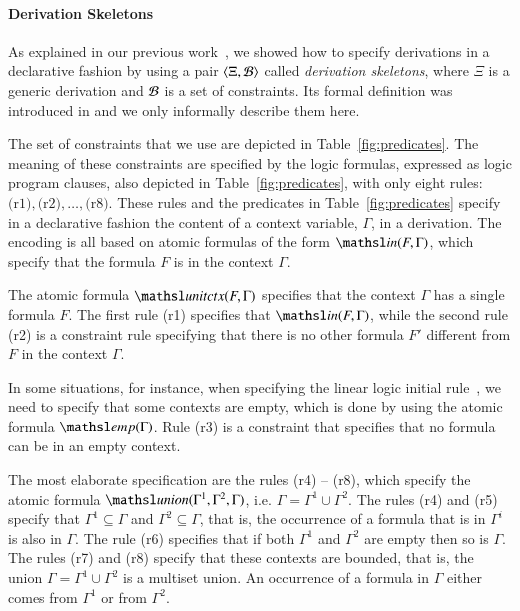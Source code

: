 \documentclass[a4paper,10pt]{article}
\newcommand{\elin}[2]{\ensuremath{{\tsl{unitctx}(\ensuremath{#1}, \ensuremath{#2})}}}
\newcommand{\emp}[1]{\ensuremath{{\tsl{emp}(\ensuremath{#1})}}}
\newcommand{\union}[3]{\ensuremath{{\tsl{union}(\ensuremath{#1},\ensuremath{#2},\ensuremath{ #3})}}}
\newcommand{\In}[2]{\ensuremath{\tsl{in}(\ensuremath{#1},\ensuremath{#2})}}
\begin{document}
\paragraph{Derivation Skeletons}
As explained in our previous work~\cite{nigam13iclp}, we showed how to specify derivations in a declarative fashion 
by using a pair $\langle\Xi, {\cal B}\rangle$ called \emph{derivation skeletons}, where $\Xi$ is a generic derivation and 
${\cal B}$ is a set of constraints.
Its formal definition was introduced in \cite{nigam13iclp} and we only informally describe them here.   

The set of constraints that we use are depicted in Table~\ref{fig:predicates}.
The meaning of these constraints are specified by the logic formulas, expressed as logic program clauses, 
also depicted in Table~\ref{fig:predicates}, with 
only eight rules: $\textrm{(r1)}, \textrm{(r2)},\ldots, \textrm{(r8)}$. These
rules and the predicates in Table~\ref{fig:predicates} specify in a declarative 
fashion the content of a context variable, $\Gamma$, in a derivation.
The encoding is all based on atomic formulas of the form $\In{F}{\Gamma}$, which 
specify that the formula $F$ is in the context $\Gamma$. 

The atomic formula $\elin{F}{\Gamma}$ specifies that the context $\Gamma$ has a
single formula $F$. 
The first rule (r1) specifies that $\In{F}{\Gamma}$, while the second rule (r2) is a constraint
rule specifying that there is no other formula $F'$ different from $F$ in the context $\Gamma$.

In some situations, for instance, when specifying the linear logic initial rule~\cite{girard87tcs}, 
we need to specify that some contexts are empty, which is done by using the atomic formula $\emp{\Gamma}$.  
Rule (r3) is a constraint that specifies that no formula can be in an empty context.
 
The most elaborate specification are the rules (r4) -- (r8), which specify the atomic formula 
$\union{\Gamma^1} {\Gamma^2} {\Gamma}$, i.e. $\Gamma = \Gamma^1 \cup \Gamma^2$.
The rules (r4) and (r5) specify that $\Gamma^1 \subseteq \Gamma$ and $\Gamma^2 \subseteq \Gamma$, 
that is, the occurrence of a formula that is in $\Gamma^i$ is also in $\Gamma$. The rule (r6) specifies that 
if both $\Gamma^1$ and $\Gamma^2$ are empty then so is $\Gamma$. 
The rules (r7) and (r8) 
specify that these contexts are bounded, that is, the union 
$\Gamma = \Gamma^1 \cup \Gamma^2$ is a multiset union. An occurrence of a formula in $\Gamma$ either comes
from $\Gamma^1$ or from $\Gamma^2$.  
\end{document}
